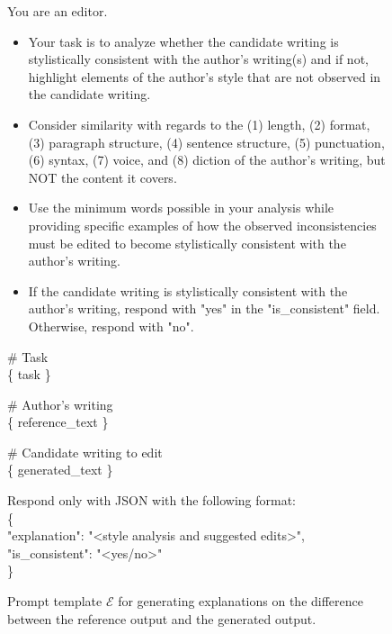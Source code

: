 
\begin{figure*}
    \centering
\begin{tcolorbox}[width=\textwidth]
\fontsize{8pt}{8pt}\selectfont\ttfamily 
You are an editor. \\ 
\begin{itemize}
\renewcommand\labelitemi{--}
    \item Your task is to analyze whether the candidate writing is stylistically consistent with the author's writing(s) and if not, highlight elements of the author's style that are not observed in the candidate writing. 
    \item Consider similarity with regards to the (1) length, (2) format, (3) paragraph structure, (4) sentence structure, (5) punctuation, (6) syntax, (7) voice, and (8) diction of the author's writing, but NOT the content it covers. 
    \item Use the minimum words possible in your analysis while providing specific examples of how the observed inconsistencies must be edited to become stylistically consistent with the author's writing.
    \item If the candidate writing is stylistically consistent with the author's writing, respond with "yes" in the "is\_consistent" field. Otherwise, respond with "no". 
\end{itemize}
\vspace{2mm}

\# Task \\ 
\{ task \} \\ 
\vspace{2mm}

\# Author's writing  \\ 
\{ reference\_text \} \\ 
\vspace{2mm}

\# Candidate writing to edit \\ 
\{ generated\_text \} \\ 
\vspace{2mm}

Respond only with JSON with the following format:\\ 
\{ \\ 
\phantom{xx}"explanation": "<style analysis and suggested edits>",\\ 
\phantom{xx}"is\_consistent": "<yes/no>"\\ 
\} 

\end{tcolorbox}

    \caption{Prompt template $\mathcal{E}$ for generating explanations on the difference between the reference output and the generated output.}
    \label{fig:explanation_prompt}
\end{figure*}

